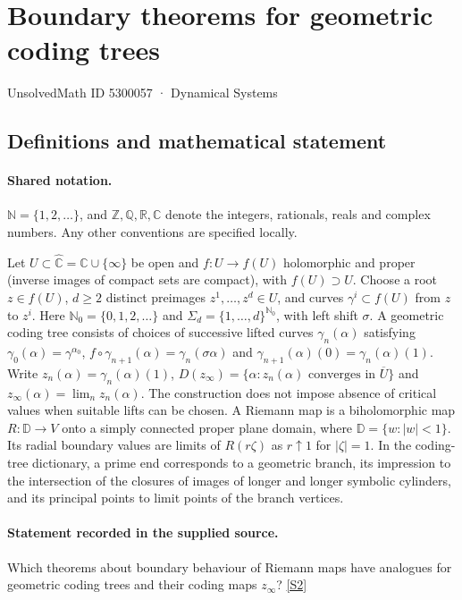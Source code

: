 \documentclass[11pt]{article}
\newcommand{\sref}[2]{\hyperlink{source:#1:#2}{[S#2]}}
\begin{document}
\setcounter{section}{5300056}
\section{Boundary theorems for geometric coding trees}\label{5300057}
{\small\sffamily UnsolvedMath ID 5300057 · Dynamical Systems}
\subsection{Definitions and mathematical statement}

\paragraph{Shared notation.}$\mathbb N=\{1,2,\ldots\}$, and $\mathbb Z,\mathbb Q,\mathbb R,\mathbb C$ denote the integers, rationals, reals and complex numbers. Any other conventions are specified locally.


Let $U\subset\widehat{\mathbb C}=\mathbb C\cup\{\infty\}$ be open and $f:U\to f(U)$ holomorphic and proper (inverse images of compact sets are compact), with $f(U)\supset U$. Choose a root $z\in f(U)$, $d\geq2$ distinct preimages $z^1,\ldots,z^d\in U$, and curves $\gamma^i\subset f(U)$ from $z$ to $z^i$. Here $\mathbb N_0=\{0,1,2,\ldots\}$ and $\Sigma_d=\{1,\ldots,d\}^{\mathbb N_0}$, with left shift $\sigma$. A geometric coding tree consists of choices of successive lifted curves $\gamma_n(\alpha)$ satisfying $\gamma_0(\alpha)=\gamma^{\alpha_0}$, $f\circ\gamma_{n+1}(\alpha)=\gamma_n(\sigma\alpha)$ and $\gamma_{n+1}(\alpha)(0)=\gamma_n(\alpha)(1)$. Write $z_n(\alpha)=\gamma_n(\alpha)(1)$, $D(z_\infty)=\{\alpha:z_n(\alpha)\text{ converges in }\overline U\}$ and $z_\infty(\alpha)=\lim_n z_n(\alpha)$. The construction does not impose absence of critical values when suitable lifts can be chosen. A Riemann map is a biholomorphic map $R:\mathbb D\to V$ onto a simply connected proper plane domain, where $\mathbb D=\{w:|w|<1\}$. Its radial boundary values are limits of $R(r\zeta)$ as $r\uparrow1$ for $|\zeta|=1$. In the coding-tree dictionary, a prime end corresponds to a geometric branch, its impression to the intersection of the closures of images of longer and longer symbolic cylinders, and its principal points to limit points of the branch vertices.
\paragraph{Statement recorded in the supplied source.}
Which theorems about boundary behaviour of Riemann maps have analogues for geometric coding trees and their coding maps $z_\infty$? \sref{5300057}{2}
\end{document}
